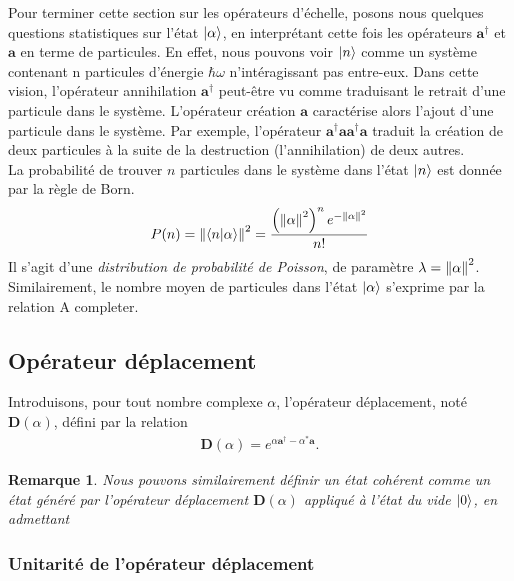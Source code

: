 \documentclass[11pt,oneside,a4paper]{article}
\newcommand{\h}{\ensuremath{\hbar}}
\newtheorem{remark}[theorem]{Remarque}
\begin{document}
Pour terminer cette section sur les opérateurs d'échelle, posons nous quelques questions statistiques sur l'état $\ket{\alpha}$, en interprétant cette fois les opérateurs $\bm{a}^\dagger$ et $\bm{a}$ en terme de particules. En effet, nous pouvons voir $\ket{n}$ comme un système contenant n particules d'énergie $\h\omega$ n'intéragissant pas entre-eux. Dans cette vision, l'opérateur annihilation $\bm{a}^\dagger$ peut-être vu comme traduisant le retrait d'une particule dans le système. L'opérateur création $\bm{a}$ caractérise alors l'ajout d'une particule dans le système. Par exemple, l'opérateur $\bm{a}^\dagger\bm{a}\bm{a}^\dagger\bm{a}$ traduit la création de deux particules à la suite de la destruction (l'annihilation) de deux autres.\\

La probabilité de trouver $n$ particules dans le système dans l'état $\ket{n}$ est donnée par la règle de Born.
\begin{align}
  P(n) = \norm{\braket{n}{\alpha}}^2 = \frac{\left(\norm{\alpha}^{2}\right)^ne^{-\norm{\alpha}^2}}{n!}
\end{align}
Il s'agit d'une \emph{distribution de probabilité de Poisson}, de paramètre $\lambda = \norm{\alpha}^2$.\\

Similairement, le nombre moyen de particules dans l'état $\ket{\alpha}$ s'exprime par la relation 
\color{red} A completer. \color{black}

\subsection{Opérateur déplacement}
Introduisons, pour tout nombre complexe $\alpha$, l'opérateur déplacement, noté $\bm{D}(\alpha)$, défini par la relation
\begin{align}
  \bm{D}(\alpha) = e^{\alpha \bm{a}^\dagger-\alpha^*\bm{a}}.
\end{align}

\begin{remark}
  Nous pouvons similairement définir un état cohérent comme un état généré par l'opérateur déplacement $\bm{D}(\alpha)$ appliqué à l'état du vide $\ket{0}$, en admettant 
\end{remark}

\subsubsection{Unitarité de l'opérateur déplacement}
\end{document}
